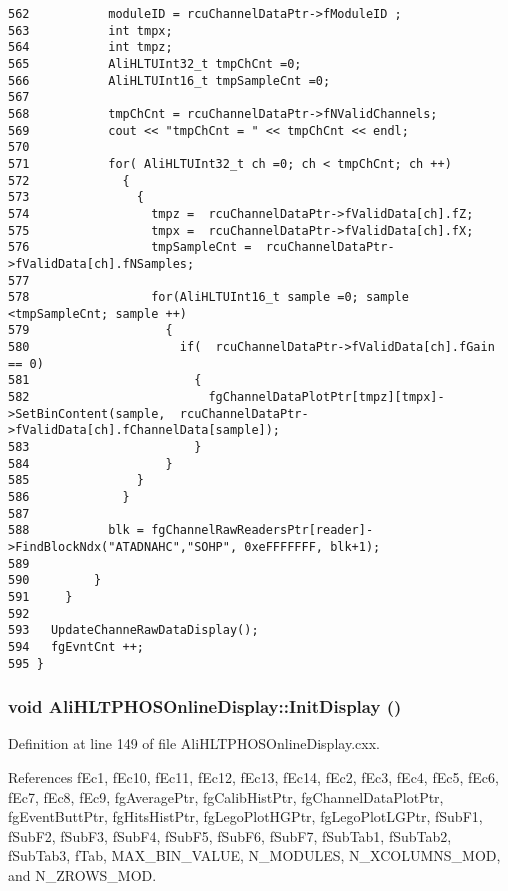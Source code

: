 \begin{verbatim}
562           moduleID = rcuChannelDataPtr->fModuleID ;
563           int tmpx;
564           int tmpz;
565           AliHLTUInt32_t tmpChCnt =0;
566           AliHLTUInt16_t tmpSampleCnt =0;
567 
568           tmpChCnt = rcuChannelDataPtr->fNValidChannels;
569           cout << "tmpChCnt = " << tmpChCnt << endl; 
570 
571           for( AliHLTUInt32_t ch =0; ch < tmpChCnt; ch ++)
572             {
573               {
574                 tmpz =  rcuChannelDataPtr->fValidData[ch].fZ;
575                 tmpx =  rcuChannelDataPtr->fValidData[ch].fX;   
576                 tmpSampleCnt =  rcuChannelDataPtr->fValidData[ch].fNSamples;
577 
578                 for(AliHLTUInt16_t sample =0; sample <tmpSampleCnt; sample ++)
579                   {
580                     if(  rcuChannelDataPtr->fValidData[ch].fGain  == 0)
581                       {
582                         fgChannelDataPlotPtr[tmpz][tmpx]->SetBinContent(sample,  rcuChannelDataPtr->fValidData[ch].fChannelData[sample]);
583                       }
584                   }
585               }
586             }
587 
588           blk = fgChannelRawReadersPtr[reader]->FindBlockNdx("ATADNAHC","SOHP", 0xeFFFFFFF, blk+1);
589 
590         } 
591     }
592   
593   UpdateChanneRawDataDisplay();
594   fgEvntCnt ++;
595 }
\end{verbatim}\normalsize 


\subsubsection{\setlength{\rightskip}{0pt plus 5cm}void Ali\-HLTPHOSOnline\-Display::Init\-Display ()}\label{classAliHLTPHOSOnlineDisplay_a4}




Definition at line 149 of file Ali\-HLTPHOSOnline\-Display.cxx.

References f\-Ec1, f\-Ec10, f\-Ec11, f\-Ec12, f\-Ec13, f\-Ec14, f\-Ec2, f\-Ec3, f\-Ec4, f\-Ec5, f\-Ec6, f\-Ec7, f\-Ec8, f\-Ec9, fg\-Average\-Ptr, fg\-Calib\-Hist\-Ptr, fg\-Channel\-Data\-Plot\-Ptr, fg\-Event\-Butt\-Ptr, fg\-Hits\-Hist\-Ptr, fg\-Lego\-Plot\-HGPtr, fg\-Lego\-Plot\-LGPtr, f\-Sub\-F1, f\-Sub\-F2, f\-Sub\-F3, f\-Sub\-F4, f\-Sub\-F5, f\-Sub\-F6, f\-Sub\-F7, f\-Sub\-Tab1, f\-Sub\-Tab2, f\-Sub\-Tab3, f\-Tab, MAX\_\-BIN\_\-VALUE, N\_\-MODULES, N\_\-XCOLUMNS\_\-MOD, and N\_\-ZROWS\_\-MOD.

